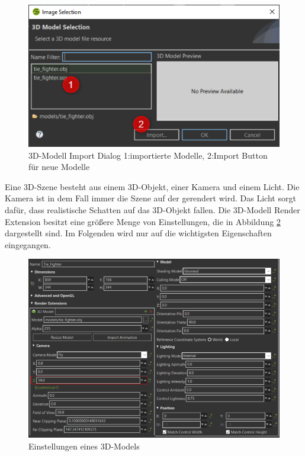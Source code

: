 \begin{figure}[htb]
	\centering
	\includegraphics[width=12cm]{img/4_hmi_tools/model_import_story}
	\caption[3D-Modell Import Dialog in Storyboard]{3D-Modell Import Dialog 1:importierte Modelle, 2:Import Button für neue Modelle}
	\label{fig:story_import}
\end{figure}


Eine 3D-Szene besteht aus einem 3D-Objekt, einer Kamera und einem Licht. Die Kamera ist in dem Fall immer die Szene auf der gerendert wird. Das Licht sorgt dafür, dass realistische Schatten auf das 3D-Objekt fallen. Die 3D-Modell Render Extension besitzt eine größere Menge von Einstellungen, die in Abbildung \ref{fig:3d_model_story} dargestellt sind. Im Folgenden wird nur auf die wichtigsten Eigenschaften eingegangen.\\

\begin{figure}[htb]
	\centering
	\includegraphics[width=\textwidth]{img/4_hmi_tools/3d_model_props}
	\caption[Einstellungen eines 3D-Models in Storyboard]{Einstellungen eines 3D-Models}
	\label{fig:3d_model_story}
\end{figure}

